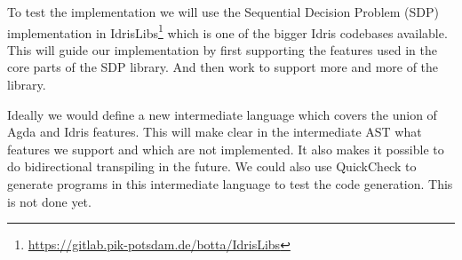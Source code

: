 \documentclass[parskip=half]{scrartcl}
\begin{document}







To test the implementation we will use the Sequential Decision Problem (SDP)
implementation in
IdrisLibs\footnote{\url{https://gitlab.pik-potsdam.de/botta/IdrisLibs}} which
is one of the bigger Idris codebases available. This will guide our
implementation by first supporting the features used in the core parts of the
SDP library. And then work to support more and more of the library.




Ideally we would define a new intermediate language which covers the union of
Agda and Idris features.  This will make clear in the intermediate AST what
features we support and which are not implemented. It also makes it possible to
do bidirectional transpiling in the future.  We could also use QuickCheck to
generate programs in this intermediate language to test the code generation.
This is not done yet.
\end{document}
